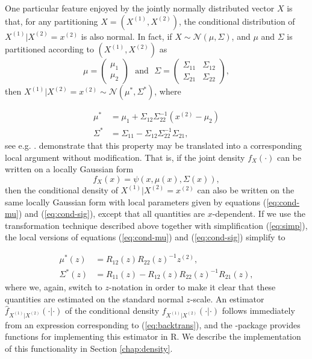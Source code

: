 One particular feature enjoyed by the jointly normally distributed vector $X$ is that, for any partitioning $X = \left(X^{\left(1\right)}, X^{\left(2\right)}\right)$, the conditional distribution of $X^{\left(1\right)}|X^{\left(2\right)} = x^{\left(2\right)}$ is also normal. In fact, if $X \sim \mathcal{N}\left(\mu,\Sigma\right)$, and $\mu$ and $\Sigma$ is partitioned according to $\left(X^{\left(1\right)}, X^{\left(2\right)}\right)$ as
$$\mu = \begin{pmatrix} \mu_1 \\\mu_2 \end{pmatrix} \,\, \textrm{ and } \,\, \Sigma = \begin{pmatrix} \Sigma_{11} & \Sigma_{12} \\ \Sigma_{21} & \Sigma_{22} \end{pmatrix},$$
then $X^{\left(1\right)}|X^{\left(2\right)} = x^{\left(2\right)} \sim \mathcal{N}\left(\mu^*, \Sigma^*\right)$, where

\begin{align}
\mu^* &= \mu_1 + \Sigma_{12}\Sigma_{22}^{-1}\left(x^{\left(2\right)} - \mu_2\right) \label{eq:cond-mu} \\
\Sigma^* &= \Sigma_{11} - \Sigma_{12}\Sigma_{22}^{-1}\Sigma_{21}, \label{eq:cond-sig}
\end{align}
see e.g. \cite[chapter 4]{john:wich:2007}. \cite{otne:tjos:2018} demonstrate that this property may be translated into a corresponding local argument without modification. That is, if the joint density $f_X\left(\cdot\right)$ can be written on a locally Gaussian form 
$$f_X\left(x\right) = \psi\left(x, \mu\left(x\right), \Sigma\left(x\right)\right),$$
then the conditional density of $X^{\left(1\right)}|X^{\left(2\right)} = x^{\left(2\right)}$ can also be written on the same locally Gaussian form with local parameters given by equations (\ref{eq:cond-mu}) and (\ref{eq:cond-sig}), except that all quantities are $x$-dependent. If we use the transformation technique described above together with simplification (\ref{eq:simp}), the local versions of equations (\ref{eq:cond-mu}) and (\ref{eq:cond-sig}) simplify to

\begin{align}
\mu^*\left(z\right) &= R_{12}\left(z\right)R_{22}\left(z\right)^{-1}z^{\left(2\right)},  \label{eq:cond-mu-trans}\\
\Sigma^*\left(z\right) &= R_{11}\left(z\right) - R_{12}\left(z\right)R_{22}\left(z\right)^{-1}R_{21}\left(z\right), \label{eq:cond-sig-trans}
\end{align}
where we, again, switch to $z$-notation in order to make it clear that these quantities are estimated on the standard normal $z$-scale. An estimator $\widehat f_{X^{\left(1\right)}|X^{\left(2\right)}}\left(\cdot|\cdot\right)$ of the conditional density $f_{X^{\left(1\right)}|X^{\left(2\right)}}\left(\cdot|\cdot\right)$ follows immediately from an expression corresponding to (\ref{eq:backtrans}), and the -package provides functions for implementing this estimator in R. We describe the implementation of this functionality in Section \ref{chap:density}.

